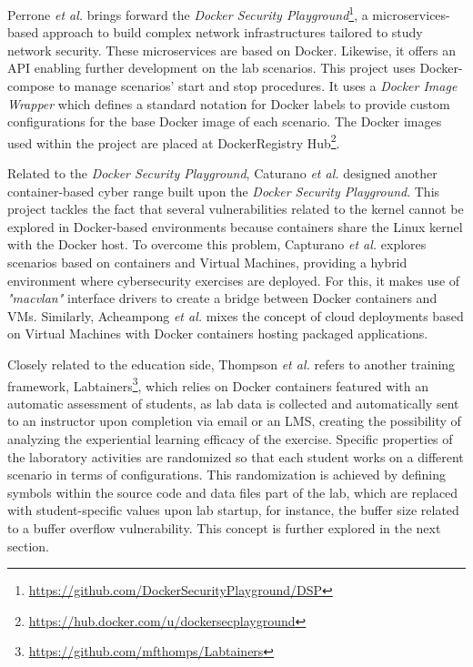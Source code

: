 
Perrone \textit{et al.} \cite{dsp_ref} brings forward the \textit{Docker Security Playground}\footnote{\url{https://github.com/DockerSecurityPlayground/DSP}}, a microservices-based approach to build complex network infrastructures tailored to study network security. These microservices are based on Docker. Likewise, it offers an API enabling further development on the lab scenarios. This project uses Docker-compose to manage scenarios' start and stop procedures. It uses a \textit{Docker Image Wrapper} which defines a standard notation for Docker labels to provide custom configurations for the base Docker image of each scenario. The Docker images used within the project are placed at DockerRegistry Hub\footnote{\url{https://hub.docker.com/u/dockersecplayground}}.


Related to the \textit{Docker Security Playground}, Caturano \textit{et al.} \cite{capturing_flags_ref} designed another container-based cyber range built upon the \textit{Docker Security Playground}. This project tackles the fact that several vulnerabilities related to the kernel cannot be explored in Docker-based environments because containers share the Linux kernel with the Docker host. To overcome this problem, Capturano \textit{et al.} explores scenarios based on containers and Virtual Machines, providing a hybrid environment where cybersecurity exercises are deployed. For this, it makes use of \textit{"macvlan"} interface drivers to create a bridge between Docker containers and VMs. Similarly, Acheampong \textit{et al.} \cite{security_scenarios_automation_ref} mixes the concept of cloud deployments based on Virtual Machines with Docker containers hosting packaged applications.

Closely related to the education side, Thompson \textit{et al.} \cite{labtainers_ref} refers to another training framework, Labtainers\footnote{\url{https://github.com/mfthomps/Labtainers}}, which relies on Docker containers featured with an automatic assessment of students, as lab data is collected and automatically sent to an instructor upon completion via email or an LMS, creating the possibility of analyzing the experiential learning efficacy of the exercise. Specific properties of the laboratory activities are randomized so that each student works on a different scenario in terms of configurations. This randomization is achieved by defining symbols within the source code and data files part of the lab, which are replaced with student-specific values upon lab startup, for instance, the buffer size related to a buffer overflow vulnerability. This concept is further explored in the next section.

